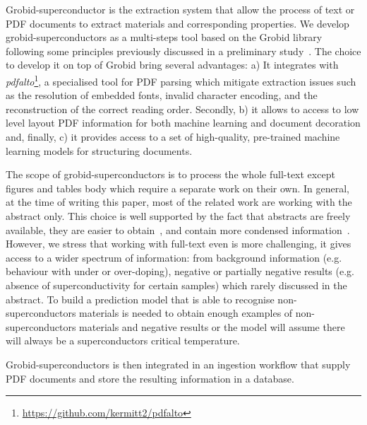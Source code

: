 \documentclass{article}
\begin{document}
Grobid-superconductor is the extraction system that allow the process of text or PDF documents to extract materials and corresponding properties. 
We develop grobid-superconductors as a multi-steps tool based on the Grobid library~\cite{GROBID} following some principles previously discussed in a preliminary study~\cite{foppiano:hal-02870896}.  
The choice to develop it on top of Grobid bring several advantages: a) It integrates with \textit{pdfalto}\footnote{\url{https://github.com/kermitt2/pdfalto}}, a specialised tool for PDF parsing which mitigate extraction issues such as the resolution of embedded fonts, invalid character encoding, and the reconstruction of the correct reading order. 
Secondly, b) it allows to access to low level layout PDF information for both machine learning and document decoration and, finally, c) it provides access to a set of high-quality, pre-trained machine learning models for structuring documents.

The scope of grobid-superconductors is to process the whole full-text except figures and tables body which require a separate work on their own. 
In general, at the time of writing this paper, most of the related work are working with the abstract only. This choice is well supported by the fact that abstracts are freely available, they are easier to obtain~\cite{kononova_text-mined_2019}, and contain more condensed information~\cite{yamaguchi-etal-2020-sc, court_magnetic_2020}. 
However, we stress that working with full-text even is more challenging, it gives access to a wider spectrum of information: from background information (e.g. behaviour with under or over-doping), negative or partially negative results (e.g. absence of superconductivity for certain samples) which rarely discussed in the abstract. 
To build a prediction model that is able to recognise non-superconductors materials is needed to obtain enough examples of non-superconductors materials and negative results or the model will assume there will always be a superconductors critical temperature. 

Grobid-superconductors is then integrated in an ingestion workflow that supply PDF documents and store the resulting information in a database.
\end{document}
